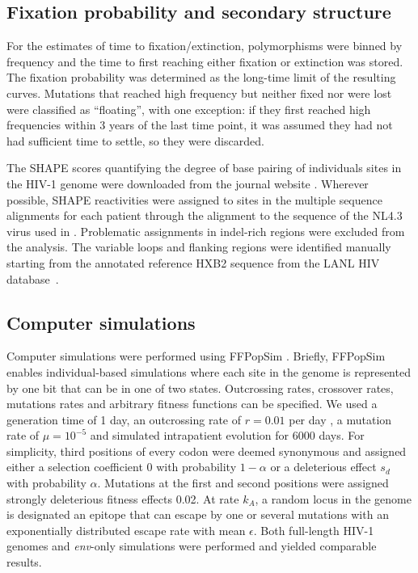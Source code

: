 \documentclass[10pt]{article}
\newcommand{\env}{\textit{env}}
\begin{document}
\subsection*{Fixation probability and secondary structure}
For the estimates of time to fixation/extinction, polymorphisms were binned by
frequency and the time to first reaching either fixation or extinction was
stored. The fixation probability was determined as the long-time limit of the
resulting curves. Mutations that reached high frequency but neither fixed nor
were lost were classified as ``floating'', with one exception: if they first
reached high frequencies within 3 years of the last time point, it was assumed
they had not had sufficient time to settle, so they were discarded.

The SHAPE scores quantifying the degree of base pairing of individuals sites in
the HIV-1 genome were downloaded from the journal website
\cite{watts_architecture_2009}. Wherever possible, SHAPE reactivities were
assigned to sites in the multiple sequence alignments for each patient through
the alignment to the sequence of the NL4.3 virus used in
\cite{watts_architecture_2009}. Problematic assignments in indel-rich
regions were excluded from the analysis. The variable loops and flanking
regions were identified manually starting from the annotated reference HXB2
sequence from the LANL HIV database~\cite{LANL2012}. 

\subsection*{Computer simulations}
Computer simulations were performed using FFPopSim
\cite{zanini_ffpopsim:_2012}. Briefly, FFPopSim enables individual-based
simulations where each site in the genome is represented by one bit that can be
in one of two states. Outcrossing rates, crossover rates, mutations rates and
arbitrary fitness functions can be specified. We used a generation time of 1
day, an outcrossing rate of $r=0.01$ per day \cite{batorsky_estimate_2011,
neher_recombination_2010}, a mutation rate of $\mu=10^{-5}$
\cite{mansky_lower_1995, abram_nature_2010} and simulated intrapatient
evolution for 6000 days. For simplicity, third positions of every codon were
deemed synonymous and assigned either a selection coefficient $0$ with
 probability $1-\alpha$ or a deleterious effect $s_d$ with probability $\alpha$.
Mutations at the first and second positions were assigned strongly deleterious 
fitness effects 0.02. At 
rate $k_A$, a random locus in the genome is designated an epitope that can
escape by one or several mutations with an exponentially distributed escape rate
with mean $\epsilon$. Both full-length HIV-1 genomes and \env{}-only simulations
were performed and yielded comparable results.
\end{document}
